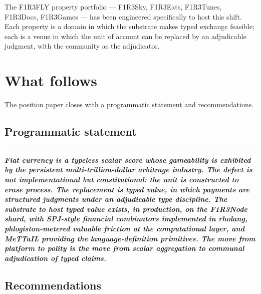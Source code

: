 \documentclass[11pt]{article}
\newcommand{\position}[1]{%
  \medskip
  \begin{quoting}[indentfirst=false, leftmargin=1em, rightmargin=1em]
  \noindent\textcolor{rhosky}{\rule{3pt}{1.2em}}\hspace{0.5em}\textbf{\textit{#1}}
  \end{quoting}
  \medskip
}
\begin{document}
The F1R3FLY property portfolio --- F1R3Sky, F1R3Eats, F1R3Tunes, F1R3Docs, F1R3Games --- has been engineered specifically to host this shift. Each property is a domain in which the substrate makes typed exchange feasible; each is a venue in which the unit of account can be replaced by an adjudicable judgment, with the community as the adjudicator.

\section{What follows}

The position paper closes with a programmatic statement and recommendations.

\subsection{Programmatic statement}

\position{Fiat currency is a typeless scalar score whose gameability is exhibited by the persistent multi-trillion-dollar arbitrage industry. The defect is not implementational but constitutional: the unit is constructed to erase process. The replacement is typed value, in which payments are structured judgments under an adjudicable type discipline. The substrate to host typed value exists, in production, on the F1R3Node shard, with SPJ-style financial combinators implemented in rholang, phlogiston-metered valuable friction at the computational layer, and MeTTaIL providing the language-definition primitives. The move from platform to polity is the move from scalar aggregation to communal adjudication of typed claims.}

\subsection{Recommendations}
\end{document}
